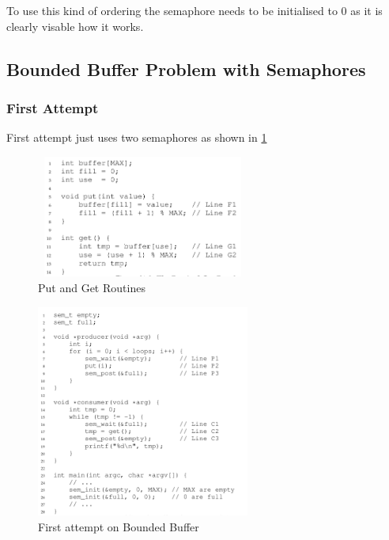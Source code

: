 To use this kind of ordering the semaphore needs to be initialised to 0 as it
is clearly visable how it works.

\subsection{Bounded Buffer Problem with Semaphores}

\subsubsection{First Attempt}

First attempt just uses two semaphores as shown in \ref{3110}

\begin{figure}[h!]
    \begin{center}
        \includegraphics[width=7cm, height=4cm]{img/319.png}
        \caption{Put and Get Routines}
    \end{center}
\end{figure}

\begin{figure}[h!]
    \label{3110}
    \begin{center}
        \includegraphics[width=7cm, height=7cm]{img/3110.png}
        \caption{First attempt on Bounded Buffer}
    \end{center}
\end{figure}

